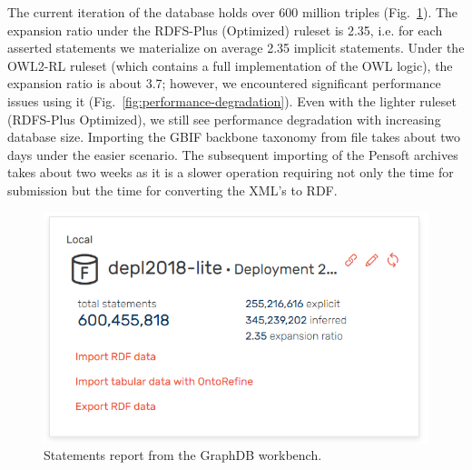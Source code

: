 The current iteration of the database holds over 600 million triples (Fig.~\ref{fig:statements-report}). The expansion ratio under the RDFS-Plus (Optimized) ruleset is 2.35, i.e. for each asserted statements we materialize on average 2.35 implicit statements. Under the OWL2-RL ruleset (which contains a full implementation of the OWL logic), the expansion ratio is about 3.7; however, we encountered significant performance issues using it (Fig.~\ref{fig:performance-degradation}). Even with the lighter ruleset (RDFS-Plus Optimized), we still see performance degradation with increasing database size. Importing the GBIF backbone taxonomy from file takes about two days under the easier scenario. The subsequent importing of the Pensoft archives takes about two weeks as it is a slower operation requiring not only the time for submission but the time for converting the XML's to RDF.

\begin{figure}
\centering
\includegraphics[width=\textwidth]{Figures/active-repository}
\decoRule
\caption[Statements report]{Statements report from the GraphDB workbench.}
\label{fig:statements-report}
\end{figure}

